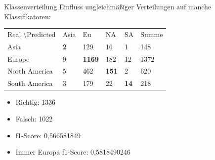 \documentclass[12pt]{beamer}
\begin{document}
\begin{frame}[fragile]{Klassenverteilung}
	Einfluss ungleichmäßiger Verteilungen auf manche Klassifikatoren: \\
	\medskip
	\begin{tabular}{|l|l|l|l|l|l|}
		\hline
		Real \textbackslash Predicted & Asia & Eu & NA & SA & Summe\\
		Asia & \textbf{2} & 129 & 16 & 1 & 148 \\
		Europe & 9 & \textbf{1169} & 182 & 12 & 1372 \\
		North America & 5 & 462 & \textbf{151} &2 & 620 \\
		South America & 3 & 179 & 22 & \textbf{14} & 218 \\
		\hline
	\end{tabular}
	
	\begin{multicols}{2}
		\begin{itemize}
			\item Richtig: 1336
			\item Falsch: 1022
			\medskip
			\item f1-Score: 0,566581849
			\item Immer Europa f1-Score: 0,5818490246
		\end{itemize}	
	\end{multicols}			
\end{frame}
\end{document}
